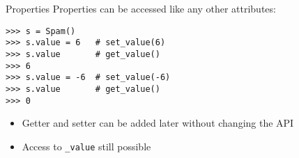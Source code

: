 \begin{frame}[fragile]{Properties}
Properties can be accessed like any other attributes:
\begin{lstlisting}[style=Shell]
>>> s = Spam()
>>> s.value = 6   # set_value(6)
>>> s.value       # get_value()
>>> 6
>>> s.value = -6  # set_value(-6)
>>> s.value       # get_value()
>>> 0
\end{lstlisting}
\begin{itemize}
\item Getter and setter can be added later without changing the API
\item Access to \lstinline{_value} still possible
\end{itemize}

\end{frame}


